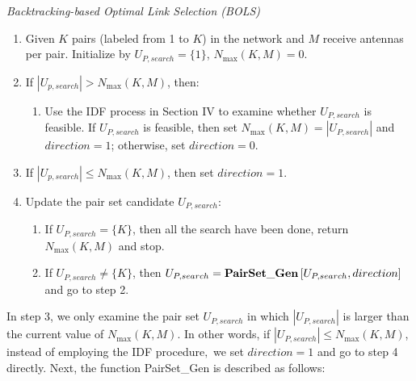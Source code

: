\documentclass[draftcls,onecolumn,peerview,12pt]{IEEEtran}
\begin{document}
\textit{Backtracking-based Optimal Link Selection (BOLS)}

\begin{enumerate}
\item Given $K$ pairs (labeled from 1 to $K$) in the network and $M$ receive antennas per pair. Initialize by $U_{P,search} =\{1\}$, $N_{\max}(K,M)=0$.
\item If $\left| {U_{p,search} } \right|>N_{\max } (K,M)$, then:
    \begin{enumerate}
    \item Use the IDF process in Section IV to examine whether $U_{P,search} $ is feasible. If $U_{P,search} $ is feasible, then set $N_{\max } (K,M)=\left| {U_{P,search} } \right|$ and $direction=1$; otherwise, set $direction=0$.
    \end{enumerate}
\item If $\left| {U_{p,search} } \right|\le N_{\max } (K,M)$, then set $direction=1$.
\item Update the pair set candidate $U_{P,search} $:
    \begin{enumerate}
    \item If $U_{P,search} =\{K\}$, then all the search have been done, return $N_{\max}(K,M)$ and stop.
    \item If $U_{P,search} \ne \{K\}$, then $U_{P,search}={\rm{\bf PairSet\_Gen}}\left[ {U_{P,search}, direction} \right]$ and go to
step 2.
    \end{enumerate}
\end{enumerate}

In step 3, we only examine the pair set $U_{P,search} $ in which
$\left| {U_{P,search} } \right|$ is larger than the current value of
$N_{\max}(K,M)$. In other words, if $\left| {U_{P,search} }
\right|\le N_{\max } (K,M)$, instead of employing the IDF
procedure$,$ we set $direction=1$ and go to step 4 directly. Next,
the function PairSet{\_}Gen is described as follows:
\end{document}
